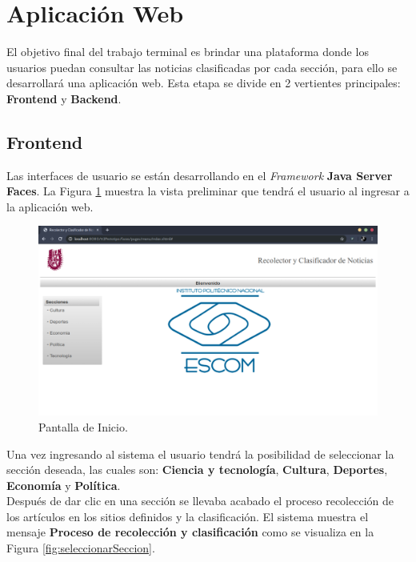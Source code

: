 \section{Aplicación Web}

El objetivo final del trabajo terminal es brindar una plataforma donde los usuarios puedan consultar las noticias clasificadas por cada sección, para ello se desarrollará una aplicación web. Esta etapa se divide en 2 vertientes principales: \textbf{Frontend} y \textbf{Backend}.\\

\subsection{Frontend}

Las interfaces de usuario se están desarrollando en el \textit{Framework} \textbf{Java Server Faces}. La Figura \ref{fig:PantallaInicio} muestra la vista preliminar que tendrá el usuario al ingresar a la aplicación web.\\

\begin{figure}[ht]
\centering
\includegraphics[scale=0.3]{imagenes/Aplicacion/PantallaInicio.png}
\caption{Pantalla de Inicio.}
\label{fig:PantallaInicio}
\end{figure}

Una vez ingresando al sistema el usuario tendrá la posibilidad de seleccionar la sección deseada, las cuales son: \textbf{Ciencia y tecnología}, \textbf{Cultura}, \textbf{Deportes}, \textbf{Economía} y \textbf{Política}.\\

Después de dar clic en una  sección se llevaba acabado el proceso recolección de los artículos en los sitios definidos  y la clasificación. El sistema muestra el mensaje \textbf{Proceso de recolección y clasificación} como se visualiza en la Figura \ref{fig:seleccionarSeccion}.\\

